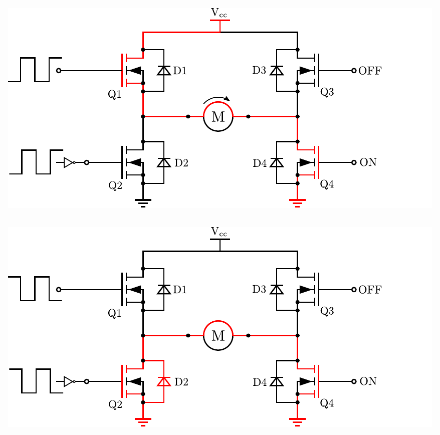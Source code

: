   \begin{minipage}{\linewidth}
  	\begin{minipage}{0.45\linewidth}
  		\begin{figure}[H]
  			\includegraphics[scale=.6]{figures/HbridgeClockwiseBrakeON.pdf}
  			\centering
  			\vspace{-.4cm}
  			\captionsetup{justification=centering}
  			\label{HbridgeClockwiseBrakeON}
  		\end{figure}\vspace{-5mm}
  	\end{minipage}
  	\hspace{0.03\linewidth}
  	\begin{minipage}{0.45\linewidth}
  		\begin{figure}[H]
  			\includegraphics[scale=.6]{figures/HbridgeClockwiseBrakeOFF.pdf}
  			\centering
  			\vspace{-.4cm}
  			\captionsetup{justification=centering}
  			\label{HbridgeClockwiseBrakeOFF}
  		\end{figure}\vspace{-5mm}
  	\end{minipage}
  \end{minipage}

